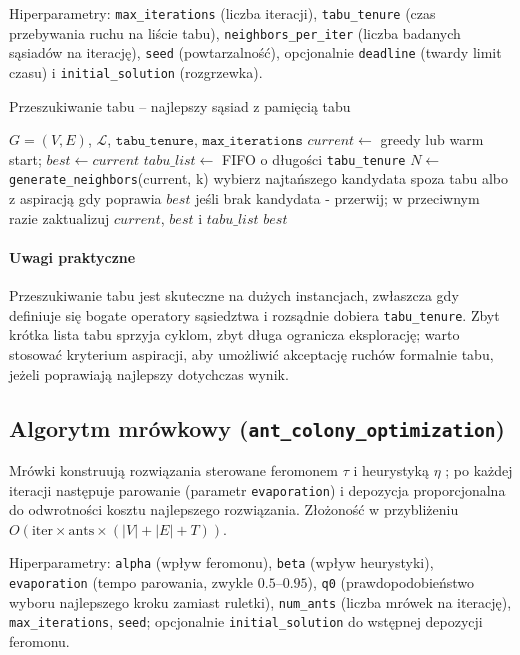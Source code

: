 Hiperparametry: \texttt{max\_iterations} (liczba iteracji), \texttt{tabu\_tenure} (czas przebywania ruchu na liście tabu), \texttt{neighbors\_per\_iter} (liczba badanych sąsiadów na iterację), \texttt{seed} (powtarzalność), opcjonalnie \texttt{deadline} (twardy limit czasu) i \texttt{initial\_solution} (rozgrzewka).

\begin{algorithm}[H]
\caption{Przeszukiwanie tabu -- najlepszy sąsiad z pamięcią tabu}
\label{alg:tabu}
\begin{algorithmic}[1]
\Require $G=(V,E)$, $\mathcal{L}$, $\texttt{tabu\_tenure}$, $\texttt{max\_iterations}$
\State $current\gets$ greedy lub warm start; $best\gets current$
\State $tabu\_list\gets$ FIFO o długości \texttt{tabu\_tenure}
  \State $N\gets$ \texttt{generate\_neighbors}(current, k)
  \State wybierz najtańszego kandydata spoza tabu albo z aspiracją gdy poprawia $best$
  \State jeśli brak kandydata - przerwij; w przeciwnym razie zaktualizuj $current$, $best$ i $tabu\_list$
\EndFor
\State \Return $best$
\end{algorithmic}
\end{algorithm}

\paragraph{Uwagi praktyczne}
Przeszukiwanie tabu jest skuteczne na dużych instancjach, zwłaszcza gdy definiuje się bogate operatory sąsiedztwa i rozsądnie dobiera \texttt{tabu\_tenure}. Zbyt krótka lista tabu sprzyja cyklom, zbyt długa ogranicza eksplorację; warto stosować kryterium aspiracji, aby umożliwić akceptację ruchów formalnie tabu, jeżeli poprawiają najlepszy dotychczas wynik.

\subsection{Algorytm mrówkowy (\texttt{ant\_colony\_optimization})}\label{subsec:aco}
Mrówki konstruują rozwiązania sterowane feromonem \(\tau\) i heurystyką \(\eta\) \cite{dorigo1997}; po każdej iteracji następuje parowanie (parametr \texttt{evaporation}) i depozycja proporcjonalna do odwrotności kosztu najlepszego rozwiązania. Złożoność w przybliżeniu \(O(\text{iter}\times\text{ants}\times(|V|+|E|+T))\).

Hiperparametry: \texttt{alpha} (wpływ feromonu), \texttt{beta} (wpływ heurystyki), \texttt{evaporation} (tempo parowania, zwykle \(0{.}5\text{--}0{.}95\)), \texttt{q0} (prawdopodobieństwo wyboru najlepszego kroku zamiast ruletki), \texttt{num\_ants} (liczba mrówek na iterację), \texttt{max\_iterations}, \texttt{seed}; opcjonalnie \texttt{initial\_solution} do wstępnej depozycji feromonu.

